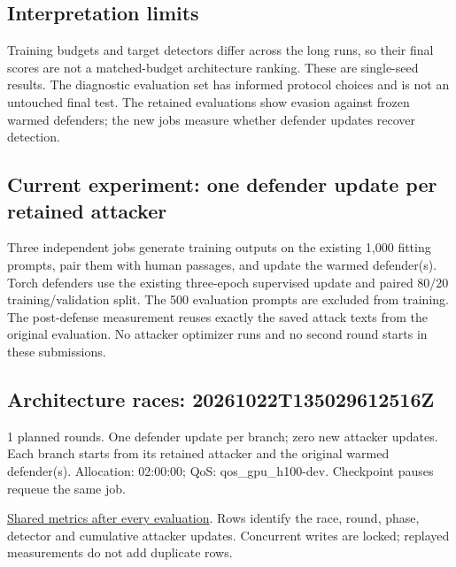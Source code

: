 \subsection{Interpretation
limits}\label{record-docs-research-results-md-interpretation-limits}

Training budgets and target detectors differ across the long runs, so
their final scores are not a matched-budget architecture ranking. These
are single-seed results. The diagnostic evaluation set has informed
protocol choices and is not an untouched final test. The retained
evaluations show evasion against frozen warmed defenders; the new jobs
measure whether defender updates recover detection.

\subsection{Current experiment: one defender update per retained
attacker}\label{record-docs-research-results-md-current-experiment-one-defender-update-per-retained-attacker}

Three independent jobs generate training outputs on the existing 1,000
fitting prompts, pair them with human passages, and update the warmed
defender(s). Torch defenders use the existing three-epoch supervised
update and paired 80/20 training/validation split. The 500 evaluation
prompts are excluded from training. The post-defense measurement reuses
exactly the saved attack texts from the original evaluation. No attacker
optimizer runs and no second round starts in these submissions.

\subsection{Architecture races:
20261022T135029612516Z}\label{record-docs-research-results-md-architecture-races-20261022t135029612516z}

1 planned rounds. One defender update per branch; zero new attacker
updates. Each branch starts from its retained attacker and the original
warmed defender(s). Allocation: 02:00:00; QoS:
qos\_\allowbreak{}gpu\_\allowbreak{}h100-dev. Checkpoint pauses requeue
the same job.

\href{../results/research_workflow/defender_comparison/races_100/20261022T135029612516Z/metrics.csv}{Shared
metrics after every evaluation}. Rows identify the race, round, phase,
detector and cumulative attacker updates. Concurrent writes are locked;
replayed measurements do not add duplicate rows.

